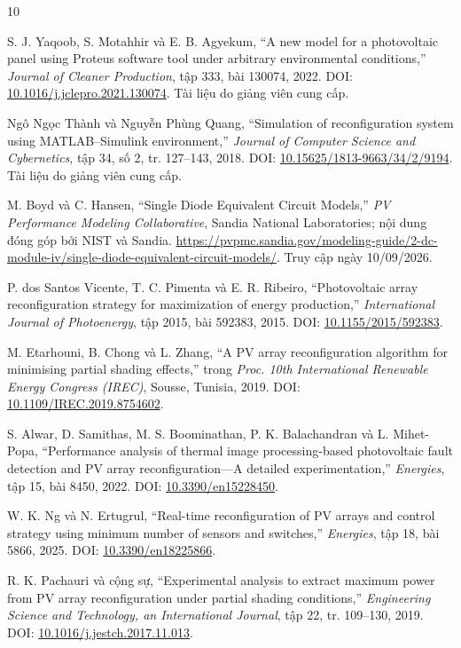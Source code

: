\renewcommand{\refname}{Tài liệu tham khảo}

\begin{thebibliography}{10}

S. J. Yaqoob, S. Motahhir và E. B. Agyekum,
``A new model for a photovoltaic panel using Proteus software tool under arbitrary environmental conditions,''
\textit{Journal of Cleaner Production}, tập 333, bài 130074, 2022.
DOI: \href{https://doi.org/10.1016/j.jclepro.2021.130074}{10.1016/j.jclepro.2021.130074}. Tài liệu do giảng viên cung cấp.

Ngô Ngọc Thành và Nguyễn Phùng Quang,
``Simulation of reconfiguration system using MATLAB--Simulink environment,''
\textit{Journal of Computer Science and Cybernetics}, tập 34, số 2, tr. 127--143, 2018.
DOI: \href{https://doi.org/10.15625/1813-9663/34/2/9194}{10.15625/1813-9663/34/2/9194}. Tài liệu do giảng viên cung cấp.

M. Boyd và C. Hansen,
``Single Diode Equivalent Circuit Models,''
\textit{PV Performance Modeling Collaborative}, Sandia National Laboratories; nội dung đóng góp bởi NIST và Sandia.
\url{https://pvpmc.sandia.gov/modeling-guide/2-dc-module-iv/single-diode-equivalent-circuit-models/}. Truy cập ngày 10/09/2026.

P. dos Santos Vicente, T. C. Pimenta và E. R. Ribeiro,
``Photovoltaic array reconfiguration strategy for maximization of energy production,''
\textit{International Journal of Photoenergy}, tập 2015, bài 592383, 2015.
DOI: \href{https://doi.org/10.1155/2015/592383}{10.1155/2015/592383}.

M. Etarhouni, B. Chong và L. Zhang,
``A PV array reconfiguration algorithm for minimising partial shading effects,''
trong \textit{Proc. 10th International Renewable Energy Congress (IREC)}, Sousse, Tunisia, 2019.
DOI: \href{https://doi.org/10.1109/IREC.2019.8754602}{10.1109/IREC.2019.8754602}.

S. Alwar, D. Samithas, M. S. Boominathan, P. K. Balachandran và L. Mihet-Popa,
``Performance analysis of thermal image processing-based photovoltaic fault detection and PV array reconfiguration---A detailed experimentation,''
\textit{Energies}, tập 15, bài 8450, 2022.
DOI: \href{https://doi.org/10.3390/en15228450}{10.3390/en15228450}.

W. K. Ng và N. Ertugrul,
``Real-time reconfiguration of PV arrays and control strategy using minimum number of sensors and switches,''
\textit{Energies}, tập 18, bài 5866, 2025.
DOI: \href{https://doi.org/10.3390/en18225866}{10.3390/en18225866}.

R. K. Pachauri và cộng sự,
``Experimental analysis to extract maximum power from PV array reconfiguration under partial shading conditions,''
\textit{Engineering Science and Technology, an International Journal}, tập 22, tr. 109--130, 2019.
DOI: \href{https://doi.org/10.1016/j.jestch.2017.11.013}{10.1016/j.jestch.2017.11.013}.

\end{thebibliography}
